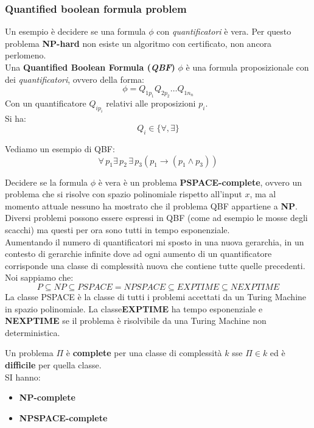 														\subsubsection{Quantified boolean formula problem}
														Un esempio è decidere se una formula $\phi$ con \textit{quantificatori} è
														vera. Per questo problema \textbf{NP-hard} non esiste un algoritmo con
														certificato, non ancora perlomeno.\\
														Una \textbf{Quantified Boolean Formula (\textit{QBF})} $\phi$ è una formula
														proposizionale con dei \textit{quantificatori}, ovvero della forma:
														\[\phi=Q_{1p_1}Q_{2p_2}\ldots Q_{1n_n}\]
														Con un quantificatore $Q_{ip_i}$ relativi alle proposizioni $p_i$.\\
														Si ha:
														\[Q_i\in\{\forall,\exists\}\]
														\begin{esempio}
															Vediamo un esempio di QBF:
															\[\forall\, p_1\exists\,p_2\,\exists\, p_3(p_1\to(p_1\land p_3))\]
														\end{esempio}
														Decidere se la formula $\phi$ è vera è un problema \textbf{PSPACE-complete},
														ovvero un problema che si risolve con spazio polinomiale rispetto all'input $x$,
														ma al momento attuale nessuno ha mostrato che il problema QBF appartiene a
														\textbf{NP}.\\
														Diversi problemi possono essere espressi in QBF (come ad esempio le mosse degli
														scacchi) ma questi per ora sono tutti in tempo esponenziale.\\
														Aumentando il numero di quantificatori mi sposto in una nuova gerarchia, in un
														contesto di gerarchie infinite dove ad ogni aumento di un quantificatore
														corrisponde una classe di complessità nuova che contiene tutte quelle
														precedenti.\\
														Noi sappiamo che:
														\[P\subseteq NP\subseteq PSPACE=NPSPACE\subseteq EXPTIME\subseteq NEXPTIME\]
														La classe PSPACE è la classe di tutti i problemi accettati da un Turing Machine
														in spazio polinomiale. La classe\textbf{EXPTIME} ha tempo esponenziale e
														\textbf{NEXPTIME} se il problema è risolvibile da una Turing Machine non
														deterministica.
														\begin{definizione}
															Un problema $\Pi$ è \textbf{complete} per una classe di complessità $k$ sse 
															$\Pi\in k$ ed è \textbf{difficile} per quella classe.\\
															SI hanno:
															\begin{itemize}
																\item \textbf{NP-complete}
																\item \textbf{NPSPACE-complete}
															\end{itemize}
														\end{definizione}
